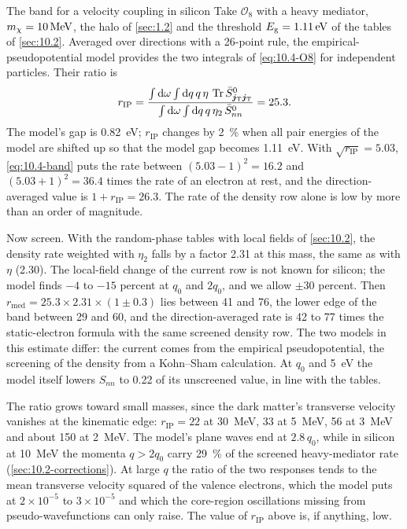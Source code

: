 \begin{workedexample}{The band for a velocity coupling in silicon}\label{we:10-band}
Take $\mathcal{O}_8$ with a heavy mediator, $m_{\chi} = \SI{10}{MeV}$, the halo of \cref{sec:1.2} and the threshold $E_{\mathrm{g}} = \SI{1.11}{eV}$ of the tables of \cref{sec:10.2}. Averaged over directions with a 26-point rule, the empirical-pseudopotential model provides the two integrals of \cref{eq:10.4-O8} for independent particles. Their ratio is
\begin{equation*}
  r_{\mathrm{IP}} = \frac{\int\mathrm{d}\omega\int\mathrm{d} q\,q\,\eta\,\operatorname{Tr}\bar S^0_{\bm{j}_{\mathrm{T}}\bm{j}_{\mathrm{T}}}}{\int\mathrm{d}\omega\int\mathrm{d} q\,q\,\eta_2\,\bar S^0_{nn}} = 25.3 .
\end{equation*}
The model's gap is \SI{0.82}{eV}; $r_{\mathrm{IP}}$ changes by \SI{2}{\percent} when all pair energies of the model are shifted up so that the model gap becomes \SI{1.11}{eV}. With $\sqrt{r_{\mathrm{IP}}} = 5.03$, \cref{eq:10.4-band} puts the rate between $(5.03 - 1)^2 = 16.2$ and $(5.03 + 1)^2 = 36.4$ times the rate of an electron at rest, and the direction-averaged value is $1 + r_{\mathrm{IP}} = 26.3$. The rate of the density row alone is low by more than an order of magnitude.

Now screen. With the random-phase tables with local fields of \cref{sec:10.2}, the density rate weighted with $\eta_2$ falls by a factor 2.31 at this mass, the same as with $\eta$ (2.30). The local-field change of the current row is not known for silicon; the model finds $-4$ to $-15$ percent at $q_0$ and $2q_0$, and we allow $\pm30$ percent. Then $r_{\mathrm{med}} = 25.3\times2.31\times(1 \pm 0.3)$ lies between 41 and 76, the lower edge of the band between 29 and 60, and the direction-averaged rate is 42 to 77 times the static-electron formula with the same screened density row. The two models in this estimate differ: the current comes from the empirical pseudopotential, the screening of the density from a Kohn--Sham calculation. At $q_0$ and \SI{5}{eV} the model itself lowers $S_{nn}$ to 0.22 of its unscreened value, in line with the tables.

The ratio grows toward small masses, since the dark matter's transverse velocity vanishes at the kinematic edge: $r_{\mathrm{IP}} = 22$ at \SI{30}{MeV}, 33 at \SI{5}{MeV}, 56 at \SI{3}{MeV} and about 150 at \SI{2}{MeV}. The model's plane waves end at $2.8\,q_0$, while in silicon at \SI{10}{MeV} the momenta $q > 2q_0$ carry \SI{29}{\percent} of the screened heavy-mediator rate (\cref{sec:10.2-corrections}). At large $q$ the ratio of the two responses tends to the mean transverse velocity squared of the valence electrons, which the model puts at $2\times10^{-5}$ to $3\times10^{-5}$ and which the core-region oscillations missing from pseudo-wavefunctions can only raise. The value of $r_{\mathrm{IP}}$ above is, if anything, low.
\end{workedexample}

